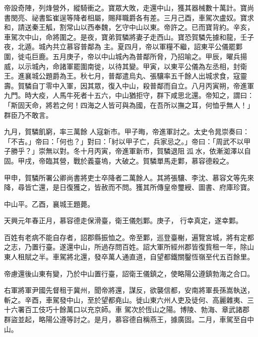 \begin{pinyinscope}
 帝設奇陣，列烽營外，縱騎衝之。寶眾大敗，走還中山，獲其器械數十萬計。寶尚書閔亮、祕書監崔逞等降者相屬，賜拜職爵各有差。三月己酉，車駕次盧奴。寶求和，請送秦王觚，割常山以西奉魏，乞守中山以東。帝許之。已而寶背約。辛亥，車駕次中山，命將圍之。是夜，寶弟賀驎將妻子走西山。寶恐賀驎先據和龍，壬子夜，北遁。城內共立慕容普鄰為
 主。夏四月，帝以軍糧不繼，詔東平公儀罷鄴圍，徙屯巨鹿。五月庚子，帝以中山城內為普鄰所脅，乃招喻之。甲辰，曜兵揚威，以示城內，命諸軍罷圍南徙，以待其變。甲寅，以東平公儀為左丞相，封衛王。進襄城公題爵為王。秋七月，普鄰遣烏丸、張驤率五千餘人出城求食，寇靈壽。賀驎自丁零中入軍，因其眾，復入中山，殺普鄰而自立。八月丙寅朔，帝進軍九門。時大疫，人馬牛死者十五六，中山猶拒守，群下咸思北還。帝知之，謂曰：「斯固天命，將若之何！四海之人皆可與為國，在吾所以撫之耳，何恤乎無人！」群臣乃不敢言。



 九月，賀驎飢窮，率三萬餘
 人寇新市。甲子晦，帝進軍討之。太史令晁崇奏曰：「不吉。」帝曰：「何也？」對曰：「紂以甲子亡，兵家忌之。」帝曰：「周武不以甲子勝乎？」崇無以對。冬十月丙寅，帝進軍新市，賀驎退阻泒水，依漸洳澤以自固。甲戌，帝臨其營，戰於義臺塢，大破之。賀驎單馬走鄴，慕容德殺之。



 甲申，賀驎所署公卿尚書將吏士卒降者二萬餘人。其將張驤、李沈、慕容文等先來降，尋皆亡還，是日復獲之，皆赦而不問。獲其所傳皇帝璽綬、圖書、府庫珍寶。



 中山平。乙酉，襄城王題薨。



 天興元年春正月，慕容德走保滑臺，衛王儀剋鄴。庚子，
 行幸真定，遂幸鄴。



 百姓有老病不能自存者，詔郡縣振恤之。帝至鄴，巡登臺榭，遍覽宮城，將有定都之志，乃置行臺。遂還中山，所過存問百姓。詔大軍所經州郡皆復貲租一年，除山東人租賦之半。車駕將北還，發卒萬人通直道，自望都鐵關鑿恆嶺至代五百餘里。



 帝慮還後山東有變，乃於中山置行臺，詔衛王儀鎮之，使略陽公遵鎮勃海之合口。



 右軍將軍尹國先督租于冀州，聞帝將還，謀反，欲襲信都，安南將軍長孫嵩執送，斬之。辛酉，車駕發中山，至於望都堯山。徙山東六州人吏及徒何、高麗雜夷、三十六署百工伎巧十餘萬口以充京師。車
 駕次於恆山之陽。博陵、勃海、章武諸郡群盜並起，略陽公遵等討之。是月，慕容德自稱燕王，據廣固。二月，車駕至自中山。




\end{pinyinscope}
